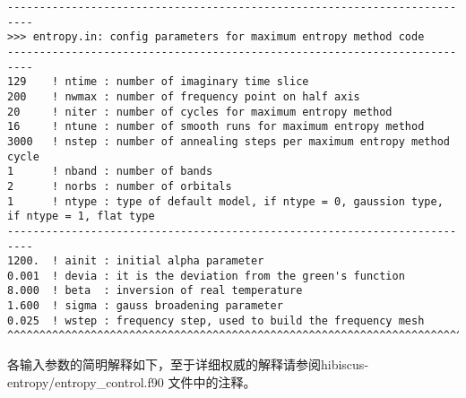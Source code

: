 \begin{lstlisting}[frame=single]
--------------------------------------------------------------------------
>>> entropy.in: config parameters for maximum entropy method code
--------------------------------------------------------------------------
129    ! ntime : number of imaginary time slice
200    ! nwmax : number of frequency point on half axis
20     ! niter : number of cycles for maximum entropy method
16     ! ntune : number of smooth runs for maximum entropy method
3000   ! nstep : number of annealing steps per maximum entropy method cycle
1      ! nband : number of bands
2      ! norbs : number of orbitals
1      ! ntype : type of default model, if ntype = 0, gaussion type, if ntype = 1, flat type
--------------------------------------------------------------------------
1200.  ! ainit : initial alpha parameter
0.001  ! devia : it is the deviation from the green's function
8.000  ! beta  : inversion of real temperature
1.600  ! sigma : gauss broadening parameter
0.025  ! wstep : frequency step, used to build the frequency mesh
^^^^^^^^^^^^^^^^^^^^^^^^^^^^^^^^^^^^^^^^^^^^^^^^^^^^^^^^^^^^^^^^^^^^^^^^^^
\end{lstlisting}

各输入参数的简明解释如下，至于详细权威的解释请参阅hibiscus-entropy/entropy\_control.f90
文件中的注释。

